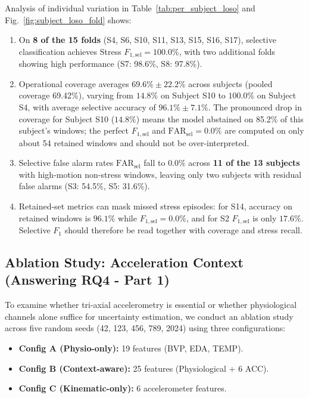 \documentclass[conference]{IEEEtran}
\begin{document}
Analysis of individual variation in Table~\ref{tab:per_subject_loso} and Fig.~\ref{fig:subject_loso_fold} shows:
\begin{enumerate}
    \item On \textbf{8 of the 15 folds} (S4, S6, S10, S11, S13, S15, S16, S17), selective classification achieves Stress $F_{1,\text{sel}} = 100.0\%$, with two additional folds showing high performance (S7: 98.6\%, S8: 97.8\%).
    \item Operational coverage averages $69.6\% \pm 22.2\%$ across subjects (pooled coverage 69.42\%), varying from $14.8\%$ on Subject S10 to $100.0\%$ on Subject S4, with average selective accuracy of $96.1\% \pm 7.1\%$. The pronounced drop in coverage for Subject S10 ($14.8\%$) means the model abstained on 85.2\% of this subject's windows; the perfect $F_{1,\text{sel}}$ and $\text{FAR}_{\text{sel}} = 0.0\%$ are computed on only about 54 retained windows and should not be over-interpreted.
    \item Selective false alarm rates $\text{FAR}_{\text{sel}}$ fall to $0.0\%$ across \textbf{11 of the 13 subjects} with high-motion non-stress windows, leaving only two subjects with residual false alarms (S3: 54.5\%, S5: 31.6\%).
    \item Retained-set metrics can mask missed stress episodes: for S14, accuracy on retained windows is $96.1\%$ while $F_{1,\text{sel}} = 0.0\%$, and for S2 $F_{1,\text{sel}}$ is only $17.6\%$. Selective $F_1$ should therefore be read together with coverage and stress recall.
\end{enumerate}

\subsection{Ablation Study: Acceleration Context (Answering RQ4 - Part 1)}
To examine whether tri-axial accelerometry is essential or whether physiological channels alone suffice for uncertainty estimation, we conduct an ablation study across five random seeds (42, 123, 456, 789, 2024) using three configurations:
\begin{itemize}
    \item \textbf{Config A (Physio-only):} 19 features (BVP, EDA, TEMP).
    \item \textbf{Config B (Context-aware):} 25 features (Physiological + 6 ACC).
    \item \textbf{Config C (Kinematic-only):} 6 accelerometer features.
\end{itemize}
\end{document}
